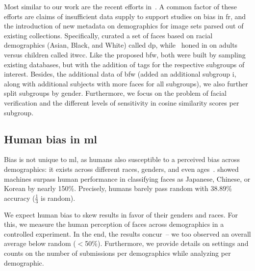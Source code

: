 Most similar to our work are the recent efforts in~\cite{das2018, demogPairs, lopez2019dataset, srinivas2019face}. A common factor of these efforts are claims of insufficient data supply to support studies on bias in \gls{fr}, and the introduction of new metadata on demographics for image sets parsed out of existing collections. Specifically, \cite{demogPairs} curated a set of faces based on racial demographics (\ie Asian, Black, and White) called \gls{dp}, while~\cite{srinivas2019face} honed in on adults versus children called \gls{itwcc}. Like the proposed \gls{bfw}, both were built by sampling existing databases, but with the addition of tags for the respective subgroups of interest. Besides, the additional data of \gls{bfw} (\ie added an additional subgroup \gls{i}, along with additional subjects with more faces for all subgroups), we also further split subgroups by gender. Furthermore, we focus on the problem of facial verification and the different levels of sensitivity in cosine similarity scores per subgroup.

\subsection{Human bias in \gls{ml}}
Bias is not unique to \gls{ml}, as humans also susceptible to a perceived bias across demographics: it exists across different races, genders, and even ages~\cite{10.1007/978-3-030-13469-3_68, bar2006, meissner2001, nicholls2018}. \cite{wang2018they} showed machines surpass human performance in classifying faces as Japanese, Chinese, or Korean by nearly 150\%. Precisely, humans barely pass random with 
38.89\% accuracy (\ie $\frac{1}{3}$ is random).

We expect human bias to skew results in favor of their genders and races. For this, we measure the human perception of faces across demographics in a controlled experiment. In the end, the results concur~\cite{wang2018they}-- we too observed an overall average below random (\ie $<$50\%). Furthermore, we provide details on settings and counts on the number of submissions per demographics while analyzing per demographic.


